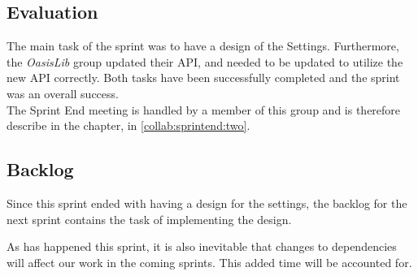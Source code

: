 \subsection*{Evaluation}

The main task of the sprint was to have a design of the Settings.
Furthermore, the \textit{OasisLib} group updated their API, and \launcher needed to be updated to utilize the new API correctly.
Both tasks have been successfully completed and the sprint was an overall success. \\

The Sprint End meeting is handled by a member of this group and is therefore describe in the  chapter, in \cref{collab:sprintend:two}.

\subsection*{Backlog}

Since this sprint ended with having a design for the settings, the backlog for the next sprint contains the task of implementing the design.

As has happened this sprint, it is also inevitable that changes to dependencies will affect our work in the coming sprints.
This added time will be accounted for.